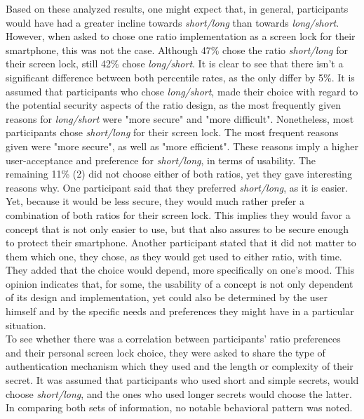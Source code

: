 Based on these analyzed results, one might expect that, in general,  participants would have had a greater incline towards \textit{short/long} than towards \textit{long/short}. However, when asked to chose one ratio implementation as a screen lock for their smartphone, this was not the case. Although 47\% chose the ratio \textit{short/long} for their screen lock, still 42\% chose \textit{long/short}. It is clear to see that there isn't a significant difference between both percentile rates, as the only differ by 5\%. It is assumed that participants who chose \textit{long/short}, made their choice with regard to the potential security aspects of the ratio design, as the most frequently given reasons for \textit{long/short} were "more secure" and "more difficult". Nonetheless, most participants chose \textit{short/long} for their screen lock. The most frequent reasons given were "more secure", as well as "more efficient". These reasons imply a higher user-acceptance and preference for \textit{short/long}, in terms of usability. The remaining 11\% (2) did not choose either of both ratios, yet they gave interesting reasons why. One participant said that they preferred \textit{short/long}, as it is easier. Yet, because it would be less secure, they would much rather prefer a combination of both ratios for their screen lock. This implies they would favor a concept that is not only easier to use, but that also assures to be secure enough to protect their smartphone. Another participant stated that it did not matter to them which one, they chose, as they would get used to either ratio, with time. They added that the choice would depend, more specifically on one's mood. This opinion indicates that, for some, the usability of a concept is not only dependent of its design and implementation, yet could also be determined by the user himself and by the specific needs and preferences they might have in a particular situation. \\

To see whether there was a correlation between participants' ratio preferences and their personal screen lock choice, they were asked to share the type of authentication mechanism which they used and the length or complexity of their secret. It was assumed that participants who used short and simple secrets, would choose \textit{short/long}, and the ones who used longer secrets would choose the latter. In comparing both sets of information, no notable behavioral pattern was noted. \\

